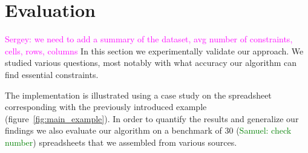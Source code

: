 \documentclass{sig-alternate-05-2015}
\newcommand{\sergey}[1]{\textcolor{magenta}{{\sc Sergey:} #1}\xspace}
\newcommand{\samuel}[1]{\textcolor{green}{{\sc Samuel:} #1}\xspace}
\newcommand{\constraints}{\ensuremath{\mathcal{T}}\xspace}
\newcommand{\format}[1]{\textit{#1}\xspace}
\newcommand{\extractgroups}{\format{extractGroups}}
\newcommand{\extracttables}{\format{extractTables}}
\newcommand{\learnconstraints}{\format{learnConstraints}}
\newcommand{\dependencies}{\ensuremath{\mathcal{D}}\xspace}
\begin{document}



\newcommand{\runtotal}{16.12}
\newcommand{\runtotalstd}{0.62}

\newcommand{\runfile}{0.50}
\newcommand{\runfilestd}{0.02}

\section{Evaluation}
\sergey{we need to add a summary of the dataset, avg number of constraints, cells, rows, columns}
In this section we experimentally validate our approach.
We studied various questions, most notably with what accuracy our algorithm can find essential constraints.

The implementation is illustrated using a case study on the spreadsheet corresponding with the previously introduced example (figure~\ref{fig:main_example}).
In order to quantify the results and generalize our findings we also evaluate our algorithm on a benchmark of 30 (\samuel{check number}) spreadsheets that we assembled from various sources.
\end{document}
